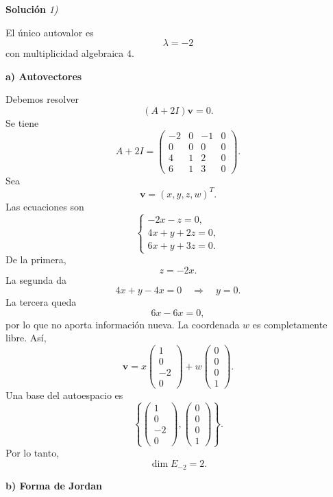 \documentclass[11pt,spanish]{article}
\begin{document}
\vspace{0.5cm}
{\bf Soluci\'on }{\em 1)}
\vspace{0.5cm}

El único autovalor es
$$
\boxed{\lambda=-2}
$$
con multiplicidad algebraica $4$.

{\bf a) Autovectores}

Debemos resolver
$$
(A+2I)\mathbf v=0.
$$
Se tiene
$$
A+2I=
\begin{pmatrix}
-2&0&-1&0\\
0&0&0&0\\
4&1&2&0\\
6&1&3&0
\end{pmatrix}.
$$
Sea
$$
\mathbf v=(x,y,z,w)^T.
$$
Las ecuaciones son
$$
\begin{cases}
-2x-z=0,\\
4x+y+2z=0,\\
6x+y+3z=0.
\end{cases}
$$
De la primera,
$$
z=-2x.
$$
La segunda da
$$
4x+y-4x=0
\quad\Longrightarrow\quad
y=0.
$$
La tercera queda
$$
6x-6x=0,
$$
por lo que no aporta información nueva.
La coordenada $w$ es completamente libre.
Así,
$$
\mathbf v
=
x
\begin{pmatrix}
1\\0\\-2\\0
\end{pmatrix}
+
w
\begin{pmatrix}
0\\0\\0\\1
\end{pmatrix}.
$$
Una base del autoespacio es
$$
\boxed{
\left\{
\begin{pmatrix}
1\\0\\-2\\0
\end{pmatrix},
\begin{pmatrix}
0\\0\\0\\1
\end{pmatrix}
\right\}.
}
$$
Por lo tanto,
$$
\boxed{\dim E_{-2}=2.}
$$

{\bf b) Forma de Jordan}
\end{document}

